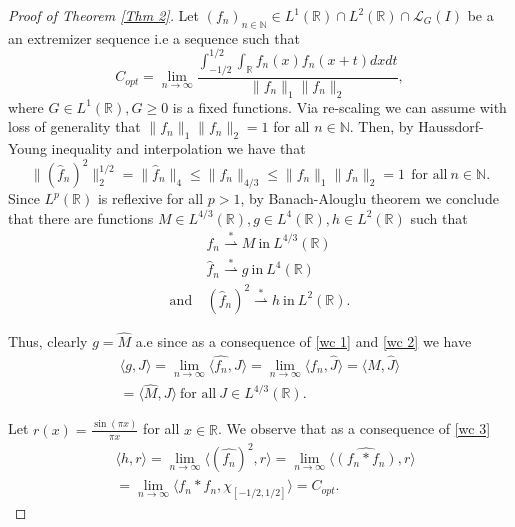 \documentclass[11pt, reqno]{amsart}
\numberwithin{equation}{section}
\newcommand{\R}{{\mathbb R}}
\newcommand{\N}{{\mathbb N}}
\begin{document}
\begin{proof}[Proof of Theorem \ref{Thm 2}]
Let $(f_n)_{n\in\N}\in L^1(\R)\cap L^{2}(\R) \cap \mathcal{L}_G(I)$ be a an extremizer sequence i.e a sequence such that
\begin{equation}
    C_{opt}=\lim_{n\to\infty}\frac{\int_{-1/2}^{1/2}\int_{\R}f_n(x)f_n(x+t) dx dt}{\|f_n\|_1\|f_n\|_2},
\end{equation}
where $G \in L^1(\R), G\ge 0$ is a fixed functions. Via re-scaling we can assume with loss of generality that 
$\|f_n\|_1\|f_n\|_2=1$ for all $n\in \N$.
Then, by Haussdorf-Young inequality and interpolation we have that
\begin{equation}
    \|(\hat f_n)^{2}\|^{1/2}_2=\|\hat f_n\|_4\leq \|f_n\|_{4/3}\leq \|f_n\|_1\|f_n\|_2=1 \ \ \text{for all} \ n\in \N.
\end{equation}
Since $L^{p}(\R)$ is reflexive for all $p>1$, by Banach-Alouglu theorem we conclude that there are functions $M\in L^{4/3}(\R),g\in L^{4}(\R), h\in L^{2}(\R)$ such that
\begin{align}
&f_n \overset{\ast}{\rightharpoonup} M\ \text{in}\ L^{4/3}(\R)\label{wc 1}\\
&\hat f_n \overset{\ast}{\rightharpoonup} g\ \text{in}\ L^{4}(\R)\label{wc 2}\\
\text{and}\ &(\hat f_n)^2 \overset{\ast}{\rightharpoonup} h\ \text{in}\ L^{2}(\R). \label{wc 3}
\end{align}

Thus, clearly $g=\hat M$ a.e since as a consequence of  \eqref{wc 1} and \eqref{wc 2} we have
\begin{align*}
\langle g,J \rangle=\lim_{n\to\infty} \langle \widehat{ f_n},J\rangle=\lim_{n\to\infty}\langle f_n,\widehat{J}\rangle=\langle M,\widehat{J}\rangle\\
=\langle \widehat{M}, J\rangle \ \text{for all}\ J\in L^{4/3}(\R).
\end{align*}

Let $r(x)=\frac{\sin(\pi x)}{\pi x}$ for all $x\in\R$. We observe that as a consequence of \eqref{wc 3}
\begin{align}\label{eq opt direction 1}
&\langle h,r \rangle =\lim_{n\to\infty} \langle(\widehat{ f_n})^{2},r\rangle=\lim_{n\to\infty} \langle \widehat{(f_n*f_n)},r\rangle \nonumber\\
&=\lim_{n\to\infty} \langle f_n*f_n,\chi_{[-1/2,1/2]} \rangle =C_{opt}.
\end{align}


\end{proof}
\end{document}
